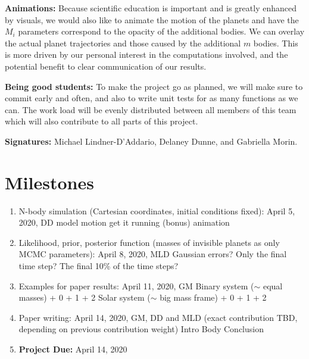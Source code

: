 \documentclass{article}
\begin{document}
\textbf{Animations:} Because scientific education is important and is greatly enhanced by visuals, we would also like to animate the motion of the planets and have the $M_i$ parameters correspond to the opacity of the additional bodies. We can overlay the actual planet trajectories and those caused by the additional $m$ bodies. This is more driven by our personal interest in the computations involved, and the potential benefit to clear communication of our results.

\textbf{Being good students:} To make the project go as planned, we will make sure to commit early and often, and also to write unit tests for as many functions as we can. The work load will be evenly distributed between all members of this team which will also contribute to all parts of this project.

\textbf{Signatures:} Michael Lindner-D'Addario, Delaney Dunne, and Gabriella Morin.

\section{Milestones}

\begin{enumerate}
    \item N-body simulation (Cartesian coordinates, initial conditions fixed): April 5, 2020, DD
        \subitem model motion
        \subitem get it running
        \subitem (bonus) animation
   
    \item Likelihood, prior, posterior function (masses of invisible planets as only MCMC parameters): April 8, 2020, MLD
        \subitem Gaussian errors?
        \subitem Only the final time step?
        \subitem The final 10\% of the time steps?

    
    \item Examples for paper results: April 11, 2020, GM
        \subitem Binary system ($\sim$ equal masses)
             + 0
             + 1
             + 2
        \subitem Solar system ($\sim$ big mass frame)
             + 0
             + 1
             + 2
    \item Paper writing: April 14, 2020, GM, DD and MLD (exact contribution TBD, depending on previous contribution weight)
        \subitem Intro
        \subitem Body
        \subitem Conclusion

    \item\textbf{Project Due:} April 14, 2020

\end{enumerate}
\end{document}
